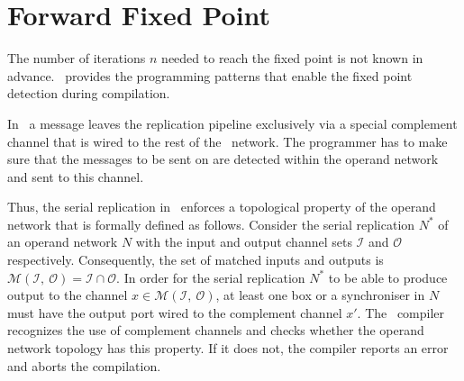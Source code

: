 %



    \section{Forward Fixed Point}
The number of iterations $n$ needed to reach the fixed point is not known in advance. \ak\ provides the programming patterns that enable the fixed point detection during compilation.



%
%


In \ak\, a message leaves the replication pipeline exclusively via a special complement channel that is wired to the rest of the \ak\ network. The programmer has to make sure that the messages to be sent on are detected within the operand network and sent to this channel. 

Thus, the serial replication in \ak\ enforces a topological property of the operand network that is formally defined as follows. Consider the serial replication $N^{*}$ of an operand network $N$ with the input and output channel sets $\mathcal{I}$ and $\mathcal{O}$ respectively. Consequently, the set of matched inputs and outputs is $\mathcal{M}(\mathcal{I}, \: \mathcal{O}) = \mathcal{I} \cap \mathcal{O}$. In order for the serial replication $N^{*}$ to be able to produce output to the channel $x \in \mathcal{M}(\mathcal{I}, \: \mathcal{O})$, at least one box or a synchroniser in $N$ must have the output port wired to the complement channel $x'$. The \ak\ compiler recognizes the use of complement channels and checks whether the operand network topology has this property. If it does not, the compiler reports an error and aborts the compilation.

